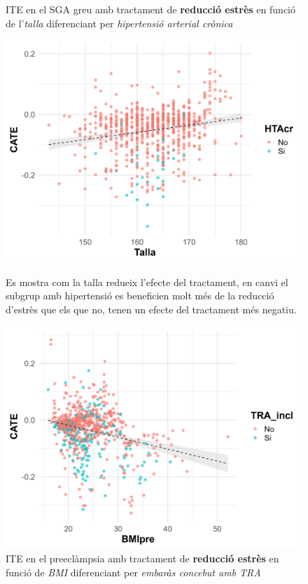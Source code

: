 \documentclass[../main.tex]{subfiles}
\begin{document}
    \begin{figure}[H]
      \centering
      \begin{minipage}[t]{0.48\textwidth}
        \captionsetup{font=small}
        \caption*{\centering ITE en el SGA greu amb tractament de \textbf{reducció estrès} en funció de l'\textit{talla} diferenciant per \textit{hipertensió arterial crònica}}
        \includegraphics[width=\textwidth]{imgs/scaterplots/scater_SGAgreu_3_TallaHTAcr.jpg}
        \captionsetup{font=footnotesize}
        \caption{Es mostra com la talla redueix l'efecte del tractament, en canvi el subgrup amb hipertensió es beneficien molt més de la reducció d'estrès que els que no, tenen un efecte del tractament més negatiu.}
        \label{plot:SGAgreu3}
      \end{minipage}
      \hspace{0.01\textwidth}
      \begin{minipage}[t]{0.48\textwidth}
        \captionsetup{font=small}
        \caption*{\centering ITE en el preeclàmpsia amb tractament de \textbf{reducció estrès} en funció de \textit{BMI} diferenciant per \textit{embaràs concebut amb TRA}}
        \includegraphics[width=\textwidth]{imgs/scaterplots/scater_PE_3_BMI_TRA.jpg}

\end{minipage}
\end{figure}
\end{document}
